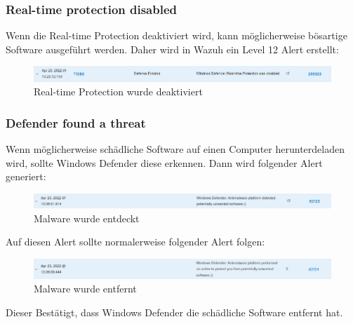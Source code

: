 \subsubsection{Real-time protection disabled}
Wenn die Real-time Protection deaktiviert wird, kann möglicherweise bösartige Software ausgeführt werden.
Daher wird in Wazuh ein Level 12 Alert erstellt: 

\begin{figure}[H]
    \centering
    \includegraphics[width=\linewidth]{../img/AV/real-time-protection.png}
    \caption{Real-time Protection wurde deaktiviert}
\end{figure}


\subsubsection{Defender found a threat}
Wenn möglicherweise schädliche Software auf einen Computer herunterdeladen wird, sollte Windows Defender diese erkennen.
Dann wird folgender Alert generiert:
\begin{figure}[H]
    \centering
    \includegraphics[width=\linewidth]{../img/AV/defender-detection.png}
    \caption{Malware wurde entdeckt}
\end{figure}

Auf diesen Alert sollte normalerweise folgender Alert folgen:
\begin{figure}[H]
    \centering
    \includegraphics[width=\linewidth]{../img/AV/defender-removal.png}
    \caption{Malware wurde entfernt}
\end{figure}

Dieser Bestätigt, dass Windows Defender die schädliche Software entfernt hat.